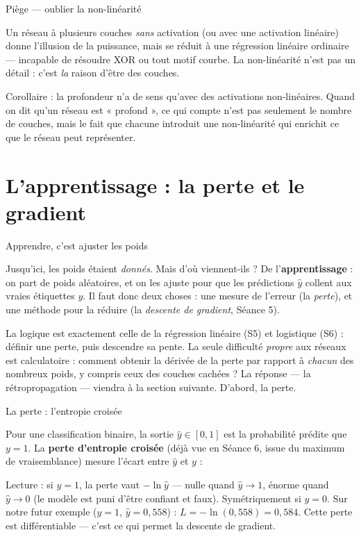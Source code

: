 \documentclass[aspectratio=169,11pt]{beamer}
\begin{document}
\begin{frame}{Piège — oublier la non-linéarité}
\begin{ucadpiege}
{\small Un réseau à plusieurs couches \emph{sans} activation (ou avec une activation linéaire) donne l'illusion de la puissance, mais se réduit à une régression linéaire ordinaire — incapable de résoudre XOR ou tout motif courbe. La non-linéarité n'est pas un détail : c'est \emph{la} raison d'être des couches.}
\end{ucadpiege}
{\small Corollaire : la profondeur n'a de sens qu'avec des activations non-linéaires. Quand on dit qu'un réseau est « profond », ce qui compte n'est pas seulement le nombre de couches, mais le fait que chacune introduit une non-linéarité qui enrichit ce que le réseau peut représenter.}
\end{frame}

\section{L'apprentissage : la perte et le gradient}

\begin{frame}{Apprendre, c'est ajuster les poids}
\begin{ucadfront}
{\small Jusqu'ici, les poids étaient \emph{donnés}. Mais d'où viennent-ils ? De l'\textbf{apprentissage} : on part de poids aléatoires, et on les ajuste pour que les prédictions $\hat y$ collent aux vraies étiquettes $y$. Il faut donc deux choses : une mesure de l'erreur (la \emph{perte}), et une méthode pour la réduire (la \emph{descente de gradient}, Séance 5).}
\end{ucadfront}
{\small La logique est exactement celle de la régression linéaire (S5) et logistique (S6) : définir une perte, puis descendre sa pente. La seule difficulté \emph{propre} aux réseaux est calculatoire : comment obtenir la dérivée de la perte par rapport à \emph{chacun} des nombreux poids, y compris ceux des couches cachées ? La réponse — la rétropropagation — viendra à la section suivante. D'abord, la perte.}
\end{frame}

\begin{frame}{La perte : l'entropie croisée}
\begin{ucaddef}[Définition]
{\small Pour une classification binaire, la sortie $\hat y \in [0,1]$ est la probabilité prédite que $y = 1$. La \textbf{perte d'entropie croisée} (déjà vue en Séance 6, issue du maximum de vraisemblance) mesure l'écart entre $\hat y$ et $y$ :}
\end{ucaddef}
{\small Lecture : si $y = 1$, la perte vaut $-\ln \hat y$ — nulle quand $\hat y \to 1$, énorme quand $\hat y \to 0$ (le modèle est puni d'être confiant et faux). Symétriquement si $y = 0$. Sur notre futur exemple ($y = 1$, $\hat y = 0{,}558$) : $L = -\ln(0{,}558) = 0{,}584$. Cette perte est différentiable — c'est ce qui permet la descente de gradient.}
\end{frame}
\end{document}
